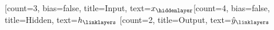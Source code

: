 
\usepackage{neuralnetwork}
\newcommand{\nnx}[2]{$x_#2$}
\newcommand{\nnh}[2]{$h_#2$}
\newcommand{\nny}[2]{$\hat{y}_#2$}

\begin{neuralnetwork}[height=4, nodespacing=9mm, layerspacing=22mm, layertitleheight=8mm]
  [count=3, bias=false, title=Input, text=\nnx]
  \hiddenlayer[count=4, bias=false, title=Hidden, text=\nnh] \linklayers
  \outputlayer[count=2, title=Output, text=\nny] \linklayers
\end{neuralnetwork}
